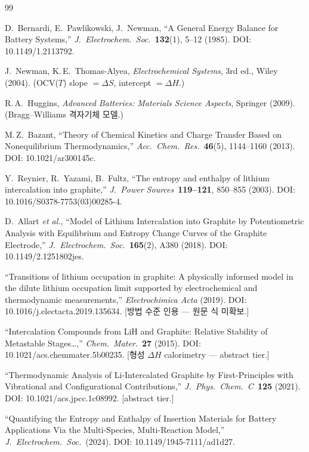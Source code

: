 \documentclass[11pt,a4paper]{article}
\begin{document}
\begin{thebibliography}{99}

D.~Bernardi, E.~Pawlikowski, J.~Newman,
``A General Energy Balance for Battery Systems,''
\emph{J.\ Electrochem.\ Soc.}\ \textbf{132}(1), 5--12 (1985).
DOI: 10.1149/1.2113792.

J.~Newman, K.\,E.~Thomas-Alyea,
\emph{Electrochemical Systems}, 3rd ed., Wiley (2004).
(OCV($T$) slope $=\Delta S$, intercept $=\Delta H$.)

R.\,A.~Huggins,
\emph{Advanced Batteries: Materials Science Aspects},
Springer (2009). (Bragg--Williams 격자기체 모델.)

M.\,Z.~Bazant,
``Theory of Chemical Kinetics and Charge Transfer Based on Nonequilibrium Thermodynamics,''
\emph{Acc.\ Chem.\ Res.}\ \textbf{46}(5), 1144--1160 (2013).
DOI: 10.1021/ar300145c.

Y.~Reynier, R.~Yazami, B.~Fultz,
``The entropy and enthalpy of lithium intercalation into graphite,''
\emph{J.\ Power Sources}\ \textbf{119--121}, 850--855 (2003).
DOI: 10.1016/S0378-7753(03)00285-4.

D.~Allart \emph{et al.},
``Model of Lithium Intercalation into Graphite by Potentiometric Analysis
with Equilibrium and Entropy Change Curves of the Graphite Electrode,''
\emph{J.\ Electrochem.\ Soc.}\ \textbf{165}(2), A380 (2018).
DOI: 10.1149/2.1251802jes.

``Transitions of lithium occupation in graphite: A physically informed model
in the dilute lithium occupation limit supported by electrochemical and
thermodynamic measurements,''
\emph{Electrochimica Acta} (2019).
DOI: 10.1016/j.electacta.2019.135634.
[방법 수준 인용 --- 원문 식 미확보.]

``Intercalation Compounds from LiH and Graphite: Relative Stability of
Metastable Stages\ldots,''
\emph{Chem.\ Mater.}\ \textbf{27} (2015).
DOI: 10.1021/acs.chemmater.5b00235.
[형성 $\Delta H$ calorimetry --- abstract tier.]

``Thermodynamic Analysis of Li-Intercalated Graphite by First-Principles
with Vibrational and Configurational Contributions,''
\emph{J.\ Phys.\ Chem.\ C}\ \textbf{125} (2021).
DOI: 10.1021/acs.jpcc.1c08992.
[abstract tier.]

``Quantifying the Entropy and Enthalpy of Insertion Materials for Battery
Applications Via the Multi-Species, Multi-Reaction Model,''
\emph{J.\ Electrochem.\ Soc.}\ (2024).
DOI: 10.1149/1945-7111/ad1d27.


\end{thebibliography}
\end{document}
